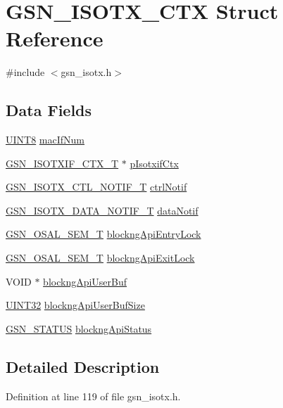 \hypertarget{a00102}{
\section{GSN\_\-ISOTX\_\-CTX Struct Reference}
\label{a00102}
}


{\ttfamily \#include $<$gsn\_\-isotx.h$>$}

\subsection*{Data Fields}
\begin{DoxyCompactItemize}
\item 
\hyperlink{a00660_gab27e9918b538ce9d8ca692479b375b6a}{UINT8} \hyperlink{a00102_ae57ae92e651751e7978e237c55133b4c}{macIfNum}
\item 
\hyperlink{a00105}{GSN\_\-ISOTXIF\_\-CTX\_\-T} $\ast$ \hyperlink{a00102_afffdfa8aef1548f076e03123267d83d6}{pIsotxifCtx}
\item 
\hyperlink{a00101}{GSN\_\-ISOTX\_\-CTL\_\-NOTIF\_\-T} \hyperlink{a00102_a5bbfd95e414448e1b9d5e929adaf91ee}{ctrlNotif}
\item 
\hyperlink{a00103}{GSN\_\-ISOTX\_\-DATA\_\-NOTIF\_\-T} \hyperlink{a00102_a774a8c18138a261927600b915c5296c1}{dataNotif}
\item 
\hyperlink{a00628_gab4b3554407ce22b940e2fcd3faf5fd47}{GSN\_\-OSAL\_\-SEM\_\-T} \hyperlink{a00102_a1375db10dcc5c2669543b8bdea7c9294}{blockngApiEntryLock}
\item 
\hyperlink{a00628_gab4b3554407ce22b940e2fcd3faf5fd47}{GSN\_\-OSAL\_\-SEM\_\-T} \hyperlink{a00102_ad31b28c2c1d66a49676adefa0939184e}{blockngApiExitLock}
\item 
VOID $\ast$ \hyperlink{a00102_a578079528c6283b8779beb3a12945bf9}{blockngApiUserBuf}
\item 
\hyperlink{a00660_gae1e6edbbc26d6fbc71a90190d0266018}{UINT32} \hyperlink{a00102_ad828642fbf78687924f94c89931c9e13}{blockngApiUserBufSize}
\item 
\hyperlink{a00660_gada5951904ac6110b1fa95e51a9ddc217}{GSN\_\-STATUS} \hyperlink{a00102_a9058d044509dc3901de07c426d816472}{blockngApiStatus}
\end{DoxyCompactItemize}


\subsection{Detailed Description}


Definition at line 119 of file gsn\_\-isotx.h.



